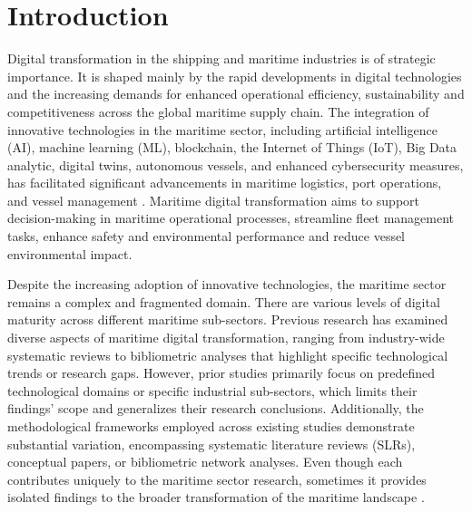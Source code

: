 \documentclass[jmse,review,submit,pdftex,moreauthors]{Definitions/mdpi}
\begin{document}

\section{Introduction}

Digital transformation in the shipping and maritime industries is of strategic importance. It is shaped mainly by the rapid developments in digital technologies and the increasing demands for enhanced operational efficiency, sustainability and competitiveness across the global maritime supply chain. The integration of innovative technologies in the maritime sector, including artificial intelligence (AI), machine learning (ML), blockchain, the Internet of Things (IoT), Big Data analytic, digital twins, autonomous vessels, and enhanced cybersecurity measures, has facilitated significant advancements in maritime logistics, port operations, and vessel management \citep{tijan2021digital,an2024maritime}. Maritime digital transformation aims to support decision-making in maritime operational processes, streamline fleet management tasks, enhance safety and environmental performance and reduce vessel environmental impact.

Despite the increasing adoption of innovative technologies, the maritime sector remains a complex and fragmented domain. There are various levels of digital maturity across different maritime sub-sectors. Previous research has examined diverse aspects of maritime digital transformation, ranging from industry-wide systematic reviews to bibliometric analyses that highlight specific technological trends or research gaps. However, prior studies primarily focus on predefined technological domains or specific industrial sub-sectors, which limits their findings' scope and generalizes their research conclusions. Additionally, the methodological frameworks employed across existing studies demonstrate substantial variation, encompassing systematic literature reviews (SLRs), conceptual papers, or bibliometric network analyses. Even though each contributes uniquely to the maritime sector research, sometimes it provides isolated findings to the broader transformation of the maritime landscape \citep{lau2024maritime,ouguz2024studies}. 
\end{document}
